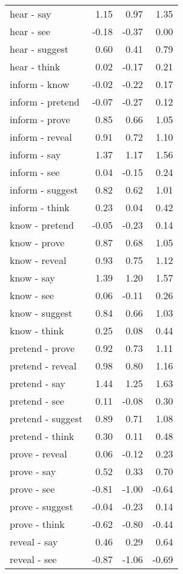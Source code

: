 \begin{longtable}{lrrr}
  hear - say & 1.15 & 0.97 & 1.35 \\ 
  hear - see & -0.18 & -0.37 & 0.00 \\ 
  hear - suggest & 0.60 & 0.41 & 0.79 \\ 
  hear - think & 0.02 & -0.17 & 0.21 \\ 
  inform - know & -0.02 & -0.22 & 0.17 \\ 
  inform - pretend & -0.07 & -0.27 & 0.12 \\ 
  inform - prove & 0.85 & 0.66 & 1.05 \\ 
  inform - reveal & 0.91 & 0.72 & 1.10 \\ 
  inform - say & 1.37 & 1.17 & 1.56 \\ 
  inform - see & 0.04 & -0.15 & 0.24 \\ 
  inform - suggest & 0.82 & 0.62 & 1.01 \\ 
  inform - think & 0.23 & 0.04 & 0.42 \\ 
  know - pretend & -0.05 & -0.23 & 0.14 \\ 
  know - prove & 0.87 & 0.68 & 1.05 \\ 
  know - reveal & 0.93 & 0.75 & 1.12 \\ 
  know - say & 1.39 & 1.20 & 1.57 \\ 
  know - see & 0.06 & -0.11 & 0.26 \\ 
  know - suggest & 0.84 & 0.66 & 1.03 \\ 
  know - think & 0.25 & 0.08 & 0.44 \\ 
  pretend - prove & 0.92 & 0.73 & 1.11 \\ 
  pretend - reveal & 0.98 & 0.80 & 1.16 \\ 
  pretend - say & 1.44 & 1.25 & 1.63 \\ 
  pretend - see & 0.11 & -0.08 & 0.30 \\ 
  pretend - suggest & 0.89 & 0.71 & 1.08 \\ 
  pretend - think & 0.30 & 0.11 & 0.48 \\ 
  prove - reveal & 0.06 & -0.12 & 0.23 \\ 
  prove - say & 0.52 & 0.33 & 0.70 \\ 
  prove - see & -0.81 & -1.00 & -0.64 \\ 
  prove - suggest & -0.04 & -0.23 & 0.14 \\ 
  prove - think & -0.62 & -0.80 & -0.44 \\ 
  reveal - say & 0.46 & 0.29 & 0.64 \\ 
  reveal - see & -0.87 & -1.06 & -0.69 \\ 

\end{longtable}

